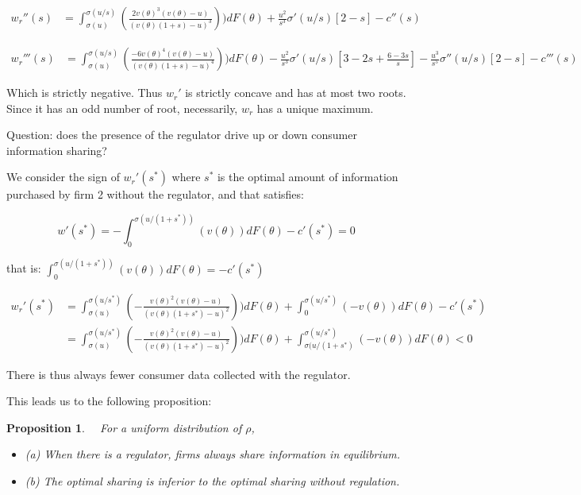 \documentclass[a4paper,leqno]{article}%
\newtheorem{prop}{Proposition}
\renewcommand{\t}{\theta}
\renewcommand{\t}{\theta}
\newcommand{\s}{\sigma}
\begin{document}
\medskip

\begin{equation}
    \begin{aligned}
w_r''(s)&=\int_{\s(u)}^{\s(u/s)}(\frac{2v(\t)^3(v(\t)-u)}{(v(\t)(1+s)-u)^3}))dF(\t)+\frac{u^2}{s^3}\s'(u/s)[2-s]-c''(s)
\end{aligned}
\end{equation}


\medskip

\begin{equation}
    \begin{aligned}
w_r'''(s)&=\int_{\s(u)}^{\s(u/s)}(\frac{-6v(\t)^4(v(\t)-u)}{(v(\t)(1+s)-u)^4}))dF(\t)-\frac{u^2}{s^3}\s'(u/s)[3-2s+\frac{6-3s}{s}]-\frac{u^3}{s^5}\s''(u/s)[2-s]-c'''(s)
\end{aligned}
\end{equation}

Which is strictly negative. Thus $w_r'$ is strictly concave and has at most two roots. Since it has an odd number of root, necessarily, $w_r$ has a unique maximum. 

\medskip

Question: does the presence of the regulator drive up or down consumer information sharing?

\medskip

We consider the sign of $w_r'(s^*)$ where $s^*$ is the optimal amount of information purchased by firm 2 without the regulator, and that satisfies: 


\[
w'(s^*)=-\int_{0}^{\s(u/(1+s^*))}(v(\t))dF(\t)-c'(s^*)=0
\]

that is: $\int_{0}^{\s(u/(1+s^*))}(v(\t))dF(\t)=-c'(s^*)$

\begin{equation}
    \begin{aligned}
w_r'(s^*)&=\int_{\s(u)}^{\s(u/s^*)}(-\frac{v(\t)^2(v(\t)-u)}{(v(\t)(1+s^*)-u)^2}))dF(\t)+\int_{0}^{\s(u/s^*)}(-v(\t))dF(\t)-c'(s^*)\\
    &=\int_{\s(u)}^{\s(u/s^*)}(-\frac{v(\t)^2(v(\t)-u)}{(v(\t)(1+s^*)-u)^2}))dF(\t)+\int_{\s(u/(1+s^*)}^{\s(u/s^*)}(-v(\t))dF(\t)<0
\end{aligned}
\end{equation}

There is thus always fewer consumer data collected with the regulator.

\medskip 

This leads us to the following proposition:

\begin{prop}~~\label{prop:2}
For a uniform distribution of $\rho$,
\begin{itemize}
    \item (a) When there is a regulator, firms always share information in equilibrium.
    \item (b) The optimal sharing is inferior to the optimal sharing without regulation.
\end{itemize} 
\end{prop}
\end{document}
